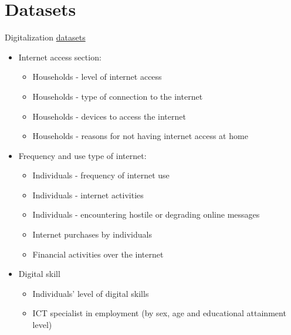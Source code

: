 \documentclass[12pt]{article}
\begin{document}
\section{Datasets}
Digitalization
\href{https://ec.europa.eu/eurostat/web/digital-economy-and-society/database}{datasets}
\begin{itemize}
    \item Internet access section:
          \begin{itemize}
              \item Households - level of internet access
              \item Households - type of connection to the internet
              \item Households - devices to access the internet
              \item Households - reasons for not having internet access at home
          \end{itemize}

    \item Frequency and use type of internet:
          \begin{itemize}
              \item Individuals - frequency of internet use
              \item Individuals - internet activities
              \item Individuals - encountering hostile or degrading online messages
              \item Internet purchases by individuals
              \item Financial activities over the internet
          \end{itemize}
    \item Digital skill
          \begin{itemize}
              \item Individuals' level of digital skills
              \item ICT specialist in employment (by sex, age and educational attainment level)
          \end{itemize}
\end{itemize}
\end{document}
